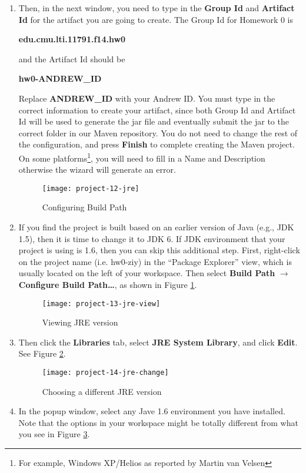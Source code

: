 \begin{enumerate}
\item Then, in the next window, you need to type in the \textbf{Group Id} and
\textbf{Artifact Id} for the artifact you are going to create. The Group Id for
Homework 0 is

\begin{center}
\textbf{edu.cmu.lti.11791.f14.hw0}
\end{center}

and the Artifact Id should be

\begin{center}
\textbf{hw0-ANDREW\_ID}
\end{center}

Replace \textbf{ANDREW\_ID} with your Andrew ID. You must type in the correct
information to create your artifact, since both Group Id and Artifact Id will be
used to generate the jar file and eventually submit the jar to the correct
folder in our Maven repository. You do not need to change the rest of the
configuration, and press \textbf{Finish} to complete creating the Maven project.
On some platforms\footnote{For example, Windows XP/Helios as reported by Martin
van Velsen}, you will need to fill in a Name and Description otherwise the
wizard will generate an error.

\begin{figure}[t]
\centering
\texttt{[image: project-12-jre]}
\caption{Configuring Build Path\label{project-12-jre}}
\end{figure}

\item If you find the project is built based on an earlier version of Java
(e.g., JDK 1.5), then it is time to change it to JDK 6. If JDK environment that
your project is using is 1.6, then you can skip this additional step. First,
right-click on the project name (i.e. hw0-ziy) in the ``Package Explorer'' view,
which is usually located on the left of your workspace. Then select
\textbf{Build Path} $\rightarrow$ \textbf{Configure Build Path\ldots}, as shown
in Figure \ref{project-12-jre}.

\begin{figure}[t]
\centering
\texttt{[image: project-13-jre-view]}
\caption{Viewing JRE version\label{project-13-jre-view}}
\end{figure}

\item Then click the \textbf{Libraries} tab, select \textbf{JRE System Library},
and click \textbf{Edit}. See Figure \ref{project-13-jre-view}.

\begin{figure}[t]
\centering
\texttt{[image: project-14-jre-change]}
\caption{Choosing a different JRE version\label{project-14-jre-change}}
\end{figure}

\item In the popup window, select any Jave 1.6 environment you have installed.
Note that the options in your workspace might be totally different from what you
see in Figure \ref{project-14-jre-change}.

\end{enumerate}

